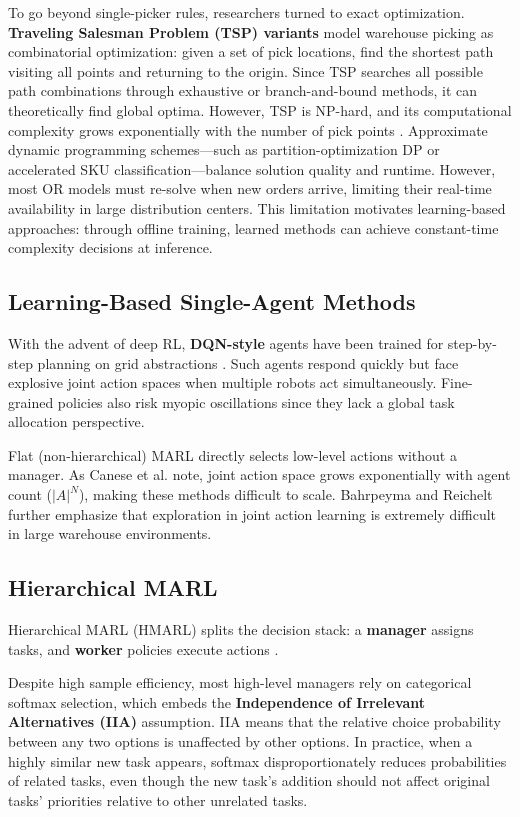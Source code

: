 \documentclass[12pt,a4paper]{article}
\begin{document}
To go beyond single-picker rules, researchers turned to exact optimization. \textbf{Traveling Salesman Problem (TSP) variants} model warehouse picking as combinatorial optimization: given a set of pick locations, find the shortest path visiting all points and returning to the origin. Since TSP searches all possible path combinations through exhaustive or branch-and-bound methods, it can theoretically find global optima. However, TSP is NP-hard, and its computational complexity grows exponentially with the number of pick points \citep{de_koster1998routing}. Approximate dynamic programming schemes---such as partition-optimization DP or accelerated SKU classification---balance solution quality and runtime. However, most OR models must re-solve when new orders arrive, limiting their real-time availability in large distribution centers. This limitation motivates learning-based approaches: through offline training, learned methods can achieve constant-time complexity decisions at inference.

\subsection{Learning-Based Single-Agent Methods}

With the advent of deep RL, \textbf{DQN-style} agents have been trained for step-by-step planning on grid abstractions \citep{alam2024rl}. Such agents respond quickly but face explosive joint action spaces when multiple robots act simultaneously. Fine-grained policies also risk myopic oscillations since they lack a global task allocation perspective.

Flat (non-hierarchical) MARL directly selects low-level actions without a manager. As Canese et al. \citep{canese2021marl} note, joint action space grows exponentially with agent count ($|A|^N$), making these methods difficult to scale. Bahrpeyma and Reichelt \citep{bahrpeyma2022review} further emphasize that exploration in joint action learning is extremely difficult in large warehouse environments.

\subsection{Hierarchical MARL}

Hierarchical MARL (HMARL) splits the decision stack: a \textbf{manager} assigns tasks, and \textbf{worker} policies execute actions \citep{krnjaic2024scalable}.

Despite high sample efficiency, most high-level managers rely on categorical softmax selection, which embeds the \textbf{Independence of Irrelevant Alternatives (IIA)} assumption. IIA means that the relative choice probability between any two options is unaffected by other options. In practice, when a highly similar new task appears, softmax disproportionately reduces probabilities of related tasks, even though the new task's addition should not affect original tasks' priorities relative to other unrelated tasks.
\end{document}
